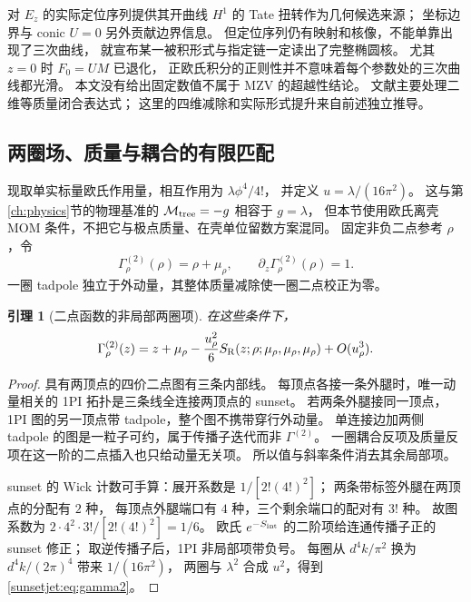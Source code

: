 \documentclass[11pt,a4paper,oneside]{ctexart}
\theoremstyle{cnplain}
\newtheorem{lemma}[theorem]{引理}
\theoremstyle{definition}
\theoremstyle{remark}
\numberwithin{equation}{section}
\begin{document}
对 $E_z$ 的实际定位序列提供其开曲线 $H^1$ 的 Tate 扭转作为几何候选来源；
坐标边界与 conic $U=0$ 另外贡献边界信息。
但定位序列仍有映射和核像，不能单靠出现了三次曲线，
就宣布某一被积形式与指定链一定读出了完整椭圆核。
尤其 $z=0$ 时 $F_0=UM$ 已退化，
正欧氏积分的正则性并不意味着每个参数处的三次曲线都光滑。
本文没有给出固定数值不属于 MZV 的超越性结论。
文献\cite{bv}主要处理二维等质量闭合表达式；
这里的四维减除和实际形式提升来自前述独立推导。


\subsection{两圈场、质量与耦合的有限匹配}\label{sunsetjet:sec:field}
现取单实标量欧氏作用量，相互作用为 $\lambda\phi^4/4!$，
并定义 $u=\lambda/(16\pi^2)$。
这与第\ref{ch:physics}节的物理基准的 $\mathcal M_{\rm tree}=-g$ 相容于 $g=\lambda$，
但本节使用欧氏离壳 MOM 条件，不把它与极点质量、在壳单位留数方案混同。
固定非负二点参考 $\rho$，令
\begin{equation}\label{sunsetjet:eq:2conditions}
 \Gamma^{(2)}_\rho(\rho)=\rho+\mu_\rho,
 \qquad \partial_z\Gamma^{(2)}_\rho(\rho)=1.
\end{equation}
一圈 tadpole 独立于外动量，其整体质量减除使一圈二点校正为零。

\begin{lemma}[二点函数的非局部两圈项]\label{sunsetjet:lem:weight}
在这些条件下，
\begin{equation}\label{sunsetjet:eq:gamma2}
 \Gamma^{(2)}_\rho(z)=z+\mu_\rho
       -\frac{u_\rho^2}{6}S_{\mathrm R}(z;\rho;\mu_\rho,\mu_\rho,\mu_\rho)
       +O(u_\rho^3).
\end{equation}
\end{lemma}
\begin{proof}
具有两顶点的四价二点图有三条内部线。
每顶点各接一条外腿时，唯一动量相关的 1PI 拓扑是三条线全连接两顶点的 sunset。
若两条外腿接同一顶点，1PI 图的另一顶点带 tadpole，整个图不携带穿行外动量。
单连接边加两侧 tadpole 的图是一粒子可约，属于传播子迭代而非 $\Gamma^{(2)}$。
一圈耦合反项及质量反项在这一阶的二点插入也只给动量无关项。
所以值与斜率条件消去其余局部项。

sunset 的 Wick 计数可手算：展开系数是
$1/[2!(4!)^2]$；
两条带标签外腿在两顶点的分配有 $2$ 种，
每顶点外腿端口有 $4$ 种，三个剩余端口的配对有 $3!$ 种。
故图系数为 $2\cdot4^2\cdot3!/[2!(4!)^2]=1/6$。
欧氏 $e^{-S_{\rm int}}$ 的二阶项给连通传播子正的 sunset 修正；
取逆传播子后，1PI 非局部项带负号。
每圈从 $d^4k/\pi^2$ 换为 $d^4k/(2\pi)^4$ 带来 $1/(16\pi^2)$，
两圈与 $\lambda^2$ 合成 $u^2$，得到 \eqref{sunsetjet:eq:gamma2}。
\end{proof}
\end{document}
